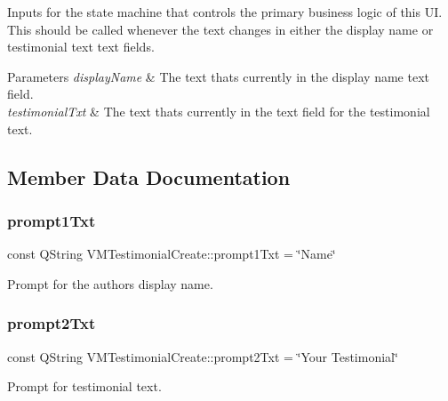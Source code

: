 Inputs for the state machine that controls the primary business logic of this UI. This should be called whenever the text changes in either the display name or testimonial text text fields. 


\begin{DoxyParams}{Parameters}
{\em display\+Name} & The text that\textquotesingle{}s currently in the display name text field. \\
\hline
{\em testimonial\+Txt} & The text that\textquotesingle{}s currently in the text field for the testimonial text. \\
\hline
\end{DoxyParams}


\subsection{Member Data Documentation}
\mbox{\label{class_v_m_testimonial_create_a9f799e8461e4a67f01b7b8b30deadd04}} 
\subsubsection{\texorpdfstring{prompt1Txt}{prompt1Txt}}
{\footnotesize\ttfamily const Q\+String V\+M\+Testimonial\+Create\+::prompt1\+Txt = \char`\"{}Name\char`\"{}}

Prompt for the author\textquotesingle{}s display name. \mbox{\label{class_v_m_testimonial_create_ab293b8c3bfa9945a4381e5ec24c572da}} 
\subsubsection{\texorpdfstring{prompt2Txt}{prompt2Txt}}
{\footnotesize\ttfamily const Q\+String V\+M\+Testimonial\+Create\+::prompt2\+Txt = \char`\"{}Your Testimonial\char`\"{}}

Prompt for testimonial text. \mbox{\label{class_v_m_testimonial_create_af2b4326b5a7abd3f815df754880ae2d5}} 
